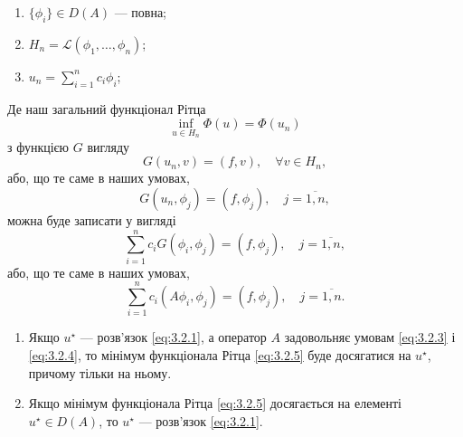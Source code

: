 \begin{algorithm}
$\left.\right.$
\begin{enumerate}
    \item $\{\phi_i\} \in D(A)$ --- повна;
    \item $H_n = \mathcal{L}(\phi_1, \ldots, \phi_n)$;
    \item $u_n = \sum_{i = 1}^n c_i \phi_i$;
\end{enumerate}
\end{algorithm}

Де наш загальний функціонал Рітца
\begin{equation}
    \label{eq:3.2.5}
    \inf_{u \in H_n} \Phi(u) = \Phi(u_n)
\end{equation}
з функцією $G$ вигляду
\begin{equation}
    \label{eq:3.2.6}
    G(u_n, v) = (f, v), \quad \forall v \in H_n,
\end{equation}
або, що те саме в наших умовах,
\begin{equation}
    \label{eq:3.2.7}
    G(u_n, \phi_j) = (f, \phi_j), \quad j = \overline{1, n},
\end{equation}
можна буде записати у вигляді
\begin{equation}
    \label{eq:3.2.8}
    \sum_{i = 1}^n c_i G(\phi_i, \phi_j) = (f, \phi_j), \quad j = \overline{1, n},
\end{equation}
або, що те саме в наших умовах,
\begin{equation}
    \label{eq:3.2.9}
    \sum_{i = 1}^n c_i (A \phi_i, \phi_j) = (f, \phi_j), \quad j = \overline{1, n}.
\end{equation}

\begin{theorem}
    \begin{enumerate}
        \item Якщо $u^\star$ --- розв'язок \eqref{eq:3.2.1}, а оператор $A$ задовольняє умовам \eqref{eq:3.2.3} і \eqref{eq:3.2.4}, то мінімум функціонала Рітца \eqref{eq:3.2.5} буде досягатися на $u^\star$, причому тільки на ньому.
        \item Якщо мінімум функціонала Рітца \eqref{eq:3.2.5} досягається на елементі $u^\star \in D(A)$, то $u^\star$ --- розв'язок \eqref{eq:3.2.1}.
    \end{enumerate}
\end{theorem}


